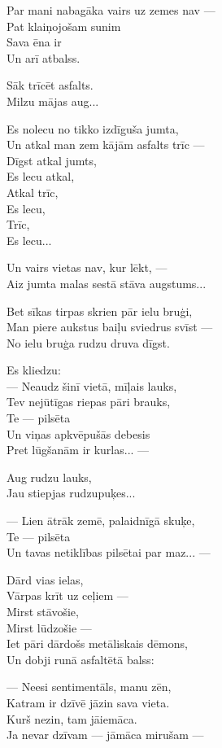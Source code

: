 \documentclass[14pt]{extarticle}
\begin{document}
Par mani nabagāka vairs uz zemes nav ---\\
Pat klaiņojošam sunim\\
Sava ēna ir\\
Un arī atbalss.

Sāk trīcēt asfalts.\\
Milzu mājas aug...

Es nolecu no tikko izdīguša jumta,\\
Un atkal man zem kājām asfalts trīc ---\\
Dīgst atkal jumts,\\
Es lecu atkal,\\
Atkal trīc,\\
Es lecu,\\
Trīc,\\
Es lecu...

Un vairs vietas nav, kur lēkt, ---\\
Aiz jumta malas sestā stāva augstums...

Bet sīkas tirpas skrien pār ielu bruģi,\\
Man piere aukstus baiļu sviedrus svīst ---\\
No ielu bruģa rudzu druva dīgst.

Es kliedzu:\\
--- Neaudz šinī vietā, mīļais lauks,\\
Tev nejūtīgas riepas pāri brauks,\\
Te --- pilsēta\\
Un viņas apkvēpušās debesis\\
Pret lūgšanām ir kurlas... ---

Aug rudzu lauks,\\
Jau stiepjas rudzupuķes...

--- Lien ātrāk zemē, palaidnīgā skuķe,\\
Te --- pilsēta\\
Un tavas netiklības pilsētai par maz... ---

Dārd vias ielas,\\
Vārpas krīt uz ceļiem ---\\
Mirst stāvošie,\\
Mirst lūdzošie ---\\
Iet pāri dārdošs metāliskais dēmons,\\
Un dobji runā asfaltētā balss:

--- Neesi sentimentāls, manu zēn,\\
Katram ir dzīvē jāzin sava vieta.\\
Kurš nezin, tam jāiemāca.\\
Ja nevar dzīvam --- jāmāca mirušam ---
\end{document}
